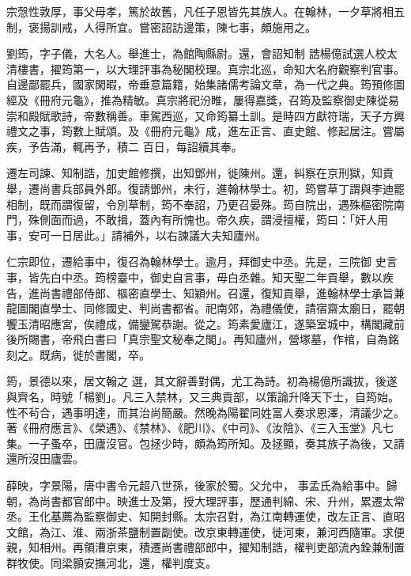 \begin{pinyinscope}
 宗愨性敦厚，事父母孝，篤於故舊，凡任子恩皆先其族人。在翰林，一夕草將相五制，褒揚訓戒，人得所宜。嘗密詔訪邊策，陳七事，頗施用之。



 劉筠，字子儀，大名人。舉進士，為館陶縣尉。還，會詔知制
 誥楊億試選人校太清樓書，擢筠第一，以大理評事為秘閣校理。真宗北巡，命知大名府觀察判官事。自邊鄙罷兵，國家閑暇，帝垂意篇籍，始集諸儒考論文章，為一代之典。筠預修圖經及《冊府元龜》，推為精敏。真宗將祀汾睢，屢得嘉獎，召筠及監察御史陳從易崇和殿賦歌詩，帝數稱善。車駕西巡，又命筠纂土訓。是時四方獻符瑞，天子方興禮文之事，筠數上賦頌。及《冊府元龜》成，進左正言、直史館、修起居注。嘗屬疾，予告滿，輒再予，積二
 百日，每詔續其奉。



 遷左司諫、知制誥，加史館修撰，出知鄧州，徙陳州。還，糾察在京刑獄，知貢舉，遷尚書兵部員外郎。復請鄧州，未行，進翰林學士。初，筠嘗草丁謂與李迪罷相制，既而謂復留，令別草制，筠不奉詔，乃更召晏殊。筠自院出，遇殊樞密院南門，殊側面而過，不敢揖，蓋內有所愧也。帝久疾，謂浸擅權，筠曰：「奸人用事，安可一日居此。」請補外，以右諫議大夫知廬州。



 仁宗即位，遷給事中，復召為翰林學士。逾月，拜御史中丞。先是，三院御
 史言事，皆先白中丞。筠榜臺中，御史自言事，毋白丞雜。知天聖二年貢舉，數以疾告，進尚書禮部侍郎、樞密直學士、知穎州。召還，復知貢舉，進翰林學士承旨兼龍圖閣直學士、同修國史、判尚書都省。祀南郊，為禮儀使，請宿齋太廟日，罷朝饗玉清昭應宮，俟禮成，備鑾駕恭謝。從之。筠素愛廬江，遂築室城中，構閣藏前後所賜書，帝飛白書曰「真宗聖文秘奉之閣」。再知廬州，營塚墓，作棺，自為銘刻之。既病，徙於書閣，卒。



 筠，景德以來，居文翰之
 選，其文辭善對偶，尤工為詩。初為楊億所識拔，後遂與齊名，時號「楊劉」。凡三入禁林，又三典貢部，以策論升降天下士，自筠始。性不茍合，遇事明達，而其治尚簡嚴。然晚為陽翟同姓富人奏求恩澤，清議少之。著《冊府應言》、《榮遇》、《禁林》、《肥川》、《中司》、《汝陰》、《三入玉堂》凡七集。一子蚤卒，田廬沒官。包拯少時，頗為筠所知。及拯顯，奏其族子為後，又請還所沒田廬雲。



 薛映，字景陽，唐中書令元超八世孫，後家於蜀。父允中，
 事孟氏為給事中。歸朝，為尚書都官郎中。映進士及第，授大理評事，歷通判綿、宋、升州，累遷太常丞。王化基薦為監察御史、知開封縣。太宗召對，為江南轉運使，改左正言、直昭文館，為江、淮、兩浙茶鹽制置副使。改京東轉運使，徙河東，兼河西隨軍。求便親，知相州。再領漕京東，積遷尚書禮部郎中，擢知制誥，權判吏部流內銓兼制置群牧使。同梁顥安撫河北，還，權判度支。




\end{pinyinscope}
